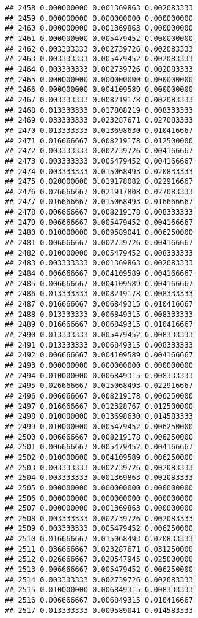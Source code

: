 \documentclass[
]{article}
\begin{document}
\begin{verbatim}
## 2458 0.000000000 0.001369863 0.002083333
## 2459 0.000000000 0.000000000 0.000000000
## 2460 0.000000000 0.001369863 0.000000000
## 2461 0.000000000 0.005479452 0.000000000
## 2462 0.003333333 0.002739726 0.002083333
## 2463 0.003333333 0.005479452 0.002083333
## 2464 0.003333333 0.002739726 0.002083333
## 2465 0.000000000 0.000000000 0.000000000
## 2466 0.000000000 0.004109589 0.000000000
## 2467 0.003333333 0.008219178 0.002083333
## 2468 0.013333333 0.017808219 0.008333333
## 2469 0.033333333 0.023287671 0.027083333
## 2470 0.013333333 0.013698630 0.010416667
## 2471 0.016666667 0.008219178 0.012500000
## 2472 0.003333333 0.002739726 0.004166667
## 2473 0.003333333 0.005479452 0.004166667
## 2474 0.003333333 0.015068493 0.020833333
## 2475 0.020000000 0.019178082 0.022916667
## 2476 0.026666667 0.021917808 0.027083333
## 2477 0.016666667 0.015068493 0.016666667
## 2478 0.006666667 0.008219178 0.008333333
## 2479 0.006666667 0.005479452 0.004166667
## 2480 0.010000000 0.009589041 0.006250000
## 2481 0.006666667 0.002739726 0.004166667
## 2482 0.010000000 0.005479452 0.008333333
## 2483 0.003333333 0.001369863 0.002083333
## 2484 0.006666667 0.004109589 0.004166667
## 2485 0.006666667 0.004109589 0.004166667
## 2486 0.013333333 0.008219178 0.008333333
## 2487 0.016666667 0.006849315 0.010416667
## 2488 0.013333333 0.006849315 0.008333333
## 2489 0.016666667 0.006849315 0.010416667
## 2490 0.013333333 0.005479452 0.008333333
## 2491 0.013333333 0.006849315 0.008333333
## 2492 0.006666667 0.004109589 0.004166667
## 2493 0.000000000 0.000000000 0.000000000
## 2494 0.010000000 0.006849315 0.008333333
## 2495 0.026666667 0.015068493 0.022916667
## 2496 0.006666667 0.008219178 0.006250000
## 2497 0.016666667 0.012328767 0.012500000
## 2498 0.010000000 0.013698630 0.014583333
## 2499 0.010000000 0.005479452 0.006250000
## 2500 0.006666667 0.008219178 0.006250000
## 2501 0.006666667 0.005479452 0.004166667
## 2502 0.010000000 0.004109589 0.006250000
## 2503 0.003333333 0.002739726 0.002083333
## 2504 0.003333333 0.001369863 0.002083333
## 2505 0.000000000 0.000000000 0.000000000
## 2506 0.000000000 0.000000000 0.000000000
## 2507 0.000000000 0.001369863 0.000000000
## 2508 0.003333333 0.002739726 0.002083333
## 2509 0.003333333 0.005479452 0.006250000
## 2510 0.016666667 0.015068493 0.020833333
## 2511 0.036666667 0.023287671 0.031250000
## 2512 0.026666667 0.020547945 0.025000000
## 2513 0.006666667 0.005479452 0.006250000
## 2514 0.003333333 0.002739726 0.002083333
## 2515 0.010000000 0.006849315 0.008333333
## 2516 0.006666667 0.006849315 0.010416667
## 2517 0.013333333 0.009589041 0.014583333

\end{verbatim}
\end{document}
